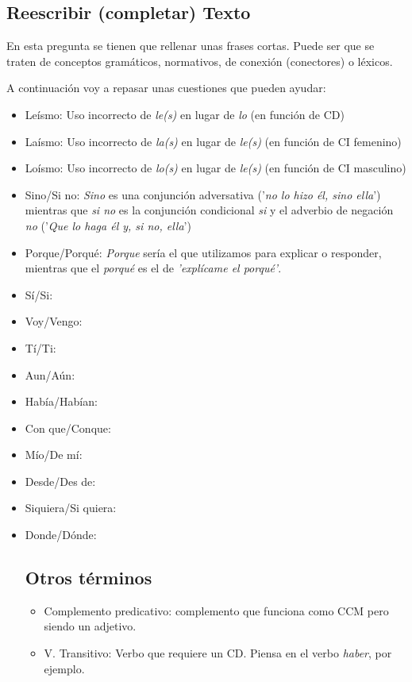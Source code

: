 \documentclass[arial,a4paper,print]{article}
\begin{document}
\pagebreak

\subsection{Reescribir (completar) Texto}
En esta pregunta se tienen que rellenar unas frases cortas. Puede ser que se traten de conceptos gramáticos, normativos, de conexión (conectores) o léxicos. 

A continuación voy a repasar unas cuestiones que pueden ayudar:
\begin{itemize}
	
\item Leísmo: Uso incorrecto de \textit{le(s)} en lugar de \textit{lo} (en función de CD)
\item Laísmo: Uso incorrecto de \textit{la(s)} en lugar de \textit{le(s)} (en función de CI femenino)
\item Loísmo: Uso incorrecto de \textit{lo(s)} en lugar de \textit{le(s)} (en función de CI masculino)
\item Sino/Si no: \textit{Sino} es una conjunción adversativa ('\textit{no lo hizo él, sino ella}') mientras que \textit{si no} es la conjunción condicional \textit{si} y el adverbio de negación \textit{no} ('\textit{Que lo haga él y, si no, ella}')
\item Porque/Porqué: \textit{Porque} sería el que utilizamos para explicar o responder, mientras que el \textit{porqué} es el de \textit{'explícame el porqué'}. 
\item Sí/Si: 
\item Voy/Vengo:
\item Tí/Ti:
\item Aun/Aún: 
\item Había/Habían:
\item Con que/Conque: 
\item Mío/De mí: 
\item Desde/Des de:
\item Siquiera/Si quiera:
\item Donde/Dónde: 


\subsection{Otros términos}
\begin{itemize}

\item Complemento predicativo: complemento que funciona como CCM pero siendo un adjetivo. 
\item V. Transitivo: Verbo que requiere un CD. Piensa en el verbo \textit{haber}, por ejemplo. 

\end{itemize}


	
\end{itemize}
	
\end{document}
